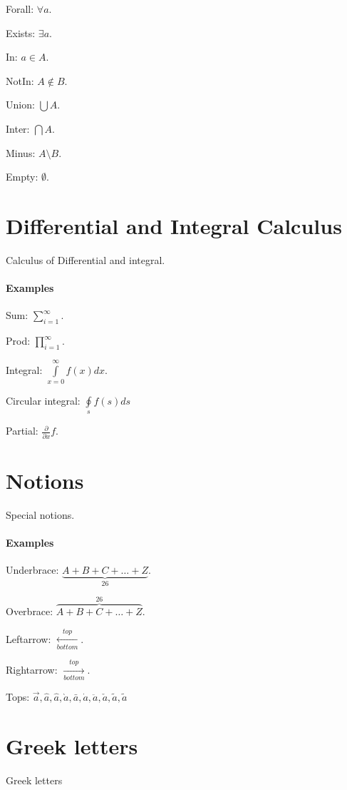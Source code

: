 \documentclass{article}[20200304]
\begin{document}
Forall: \(\forall a\).

Exists: \(\exists a\).

In: \(a \in A\).

NotIn: \(A \notin B\).

Union: \(\bigcup A\).

Inter: \(\bigcap A\).

Minus: \(A \setminus B\).

Empty: \(\emptyset\).

\section{Differential and Integral Calculus}
Calculus of Differential and integral.

\paragraph{Examples}

Sum: \(\sum \limits_{i=1}^{\infty}\).

Prod: \(\prod \limits_{i=1}^{\infty}\).

Integral: \(\int \limits_{x=0}^{\infty} f(x) d{x}\).

Circular integral: \(\oint \limits_{s} f(s) d{s}\)

Partial: \(\frac{\partial}{\partial x} f\).

\section{Notions}
Special notions.

\paragraph{Examples}

Underbrace: \(\underbrace{A+B+C+ \dots +Z}_{\text{26}}\).

Overbrace: \(\overbrace{A+B+C+ \dots +Z}^{\text{26}}\).

Leftarrow: \(\xleftarrow[bottom]{top}\).

Rightarrow: \(\xrightarrow[bottom]{top}\).

Tops: \(\vec{a}, \hat{a}, \widehat{a}, \grave{a}, \bar{a}, \dot{a}, \ddot{a}, \check{a}, \tilde{a}, \widetilde{a}\)

\section{Greek letters}
Greek letters
\end{document}
